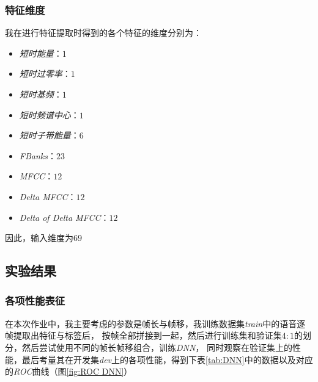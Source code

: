 \documentclass[a4paper]{article}
\begin{document}
\subsubsection{特征维度}
我在进行特征提取时得到的各个特征的维度分别为：
  \begin{itemize}
    \item \emph{短时能量}：$1$
    \item \emph{短时过零率}：$1$
    \item \emph{短时基频}：$1$
    \item \emph{短时频谱中心}：$1$
    \item \emph{短时子带能量}：$6$
    \item \emph{FBanks}：$23$
    \item \emph{MFCC}：$12$
    \item \emph{Delta MFCC}：$12$
    \item \emph{Delta of Delta MFCC}：$12$
  \end{itemize}
  因此，输入维度为$69$

\subsection{实验结果}

\subsubsection{各项性能表征}
在本次作业中，我主要考虑的参数是帧长与帧移，我训练数据集\emph{train}中的语音逐帧提取出特征与标签后，
按帧全部拼接到一起，然后进行训练集和验证集$4: 1$的划分，然后尝试使用不同的帧长帧移组合，训练\emph{DNN}，
同时观察在验证集上的性能，最后考量其在开发集\emph{dev}上的各项性能，得到下表\ref{tab:DNN}中的数据以及对应的\emph{ROC}曲线（图\ref{fig:ROC DNN}）
\end{document}
